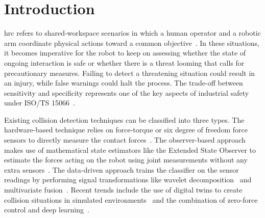 \documentclass[pdflatex,sn-mathphys-num]{sn-jnl}%
\begin{document}

\maketitle


\section{Introduction}\label{sec:introduction}

\Ac{hrc} refers to shared-workspace scenarios in which a human operator and a robotic arm coordinate physical actions toward a common objective~\cite{selvaggio2021autonomy}. In these situations, it becomes imperative for the robot to keep on assessing whether the state of ongoing interaction is safe or whether there is a threat looming that calls for precautionary measures. Failing to detect a threatening situation could result in an injury, while false warnings could halt the process. The trade-off between sensitivity and specificity represents one of the key aspects of industrial safety under ISO/TS 15066~\cite{iso15066}.

Existing collision detection techniques can be classified into three types. The hardware-based technique relies on force-torque or six degree of freedom force sensors to directly measure the contact forces~\cite{wang2025sixdof}. The observer-based approach makes use of mathematical state estimators like the Extended State Observer to estimate the forces acting on the robot using joint measurements without any extra sensors~\cite{tonti2024eso}. The data-driven approach trains the classifier on the sensor readings by performing signal transformations like wavelet decomposition~\cite{niu2024wavelet} and multivariate fusion~\cite{fang2024multivariate}. Recent trends include the use of digital twins to create collision situations in simulated environments~\cite{an2024digitaltwin} and the combination of zero-force control and deep learning~\cite{zhao2025zeroforce}.
\end{document}
